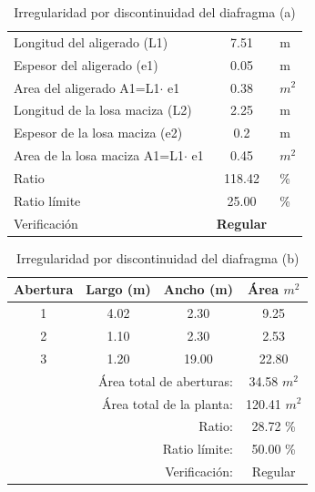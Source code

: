 \documentclass{article}%
\begin{document}
%


\begin{table}[H]%
\centering%
\caption{Irregularidad por discontinuidad del diafragma (a)}%
\begin{tabular}{|ll|c|r}%
\cline{1-3}%
\multicolumn{2}{|l|}{Longitud del aligerado (L1)} & 7.51 & \multicolumn{1}{l}{m} \\%
\cline{1-3}%
\multicolumn{2}{|l|}{Espesor del aligerado (e1)} & 0.05 & \multicolumn{1}{l}{m} \\%
\cline{1-3}%
\multicolumn{2}{|l|}{Area del aligerado A1=L1$\cdot$ e1} & 0.38 & \multicolumn{1}{l}{$m^2$} \\%
\cline{1-3}%
\multicolumn{2}{|l|}{Longitud de la losa maciza (L2)} & 2.25 & \multicolumn{1}{l}{m} \\%
\cline{1-3}%
\multicolumn{2}{|l|}{Espesor de la losa maciza (e2)} & 0.2 & \multicolumn{1}{l}{m} \\%
\cline{1-3}%
\multicolumn{2}{|l|}{Area de la losa maciza A1=L1$\cdot$ e1} & 0.45 & \multicolumn{1}{l}{$m^2$} \\%
\cline{1-3}%
\multicolumn{2}{|l|}{Ratio} & 118.42 & \multicolumn{1}{l}{\%} \\%
\cline{1-3}%
\multicolumn{2}{|l|}{Ratio límite} & 25.00 & \multicolumn{1}{l}{\%} \\%
\cline{1-3}%
\multicolumn{2}{|l|}{Verificación} & \textcolor[rgb]{ .267,  .447,  .769}{\textbf{Regular}} & \multicolumn{1}{l}{} \\%
\cline{1-3}%
\end{tabular}%
\end{table}

%


\begin{table}[H]%
\centering%
\caption{Irregularidad por discontinuidad del diafragma (b)}%
\begin{tabular}{cccc}%
\hline%
\textbf{Abertura}&\textbf{Largo (m)}&\textbf{Ancho (m)}&\textbf{Área $m^2$}\\%
\hline%
1&4.02&2.30&9.25\\%
\hline%
2&1.10&2.30&2.53\\%
\hline%
3&1.20&19.00&22.80\\%
\hline%
&\multicolumn{2}{r}{Área total de aberturas:}&34.58 $m^2$\\%
&\multicolumn{2}{r}{Área total de la planta:}&120.41 $m^2$\\%
&\multicolumn{2}{r}{Ratio:}&28.72 \%\\%
&\multicolumn{2}{r}{Ratio límite:}&50.00 \%\\%
&\multicolumn{2}{r}{Verificación:}&\textcolor[rgb]{ .267,  .447,  .769} {Regular}\\%
\end{tabular}%
\end{table}

%
\end{document}
